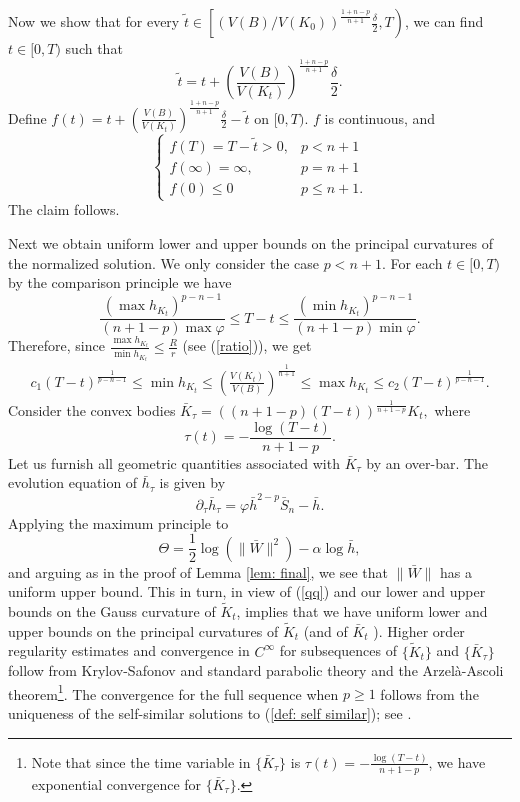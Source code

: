 \documentclass{amsart}
\theoremstyle{definition}
\theoremstyle{remark}
\numberwithin{equation}{section}
\begin{document}
Now we show that for every
 $\tilde{t}\in\left[\left(V(B)/V(K_0)\right)^{\frac{1+n-p}{n+1}}\frac{\delta}{2},T\right)$, we can find $t\in[0,T)$ such that
\[\tilde{t}=t+\left(\frac{V(B)}{V(K_t)}\right)^{\frac{1+n-p}{n+1}}\frac{\delta}{2}.\]
Define $f(t)=t+\left(\frac{V(B)}{V(K_t)}\right)^{\frac{1+n-p}{n+1}}\frac{\delta}{2}-\tilde{t}$ on $[0,T)$.
$f$ is continuous, and
\[\left\{
    \begin{array}{ll}
      f(T)=T-\tilde{t}>0, & p<n+1 \\
      f(\infty)=\infty, & p= n+1 \\
      f(0)\leq 0& p\leq  n+1 .
    \end{array}
  \right.
\]
The claim follows.

Next we obtain uniform lower and upper bounds on the principal curvatures of the normalized solution. We only consider the case $p<n+1.$
For each $t\in [0,T)$ by the comparison principle we have
\[\frac{(\max h_{K_t})^{p-n-1}}{(n+1-p)\max \varphi}\leq T-t\leq \frac{(\min h_{K_t})^{{p-n-1}}}{(n+1-p)\min \varphi}.\]
Therefore, since $\frac{\max h_{K_t}}{\min h_{K_t}}\leq \frac{R}{r}$ (see (\ref{ratio})), we get
\begin{align}\label{qq}
c_1(T-t)^{\frac{1}{p-n-1}}\leq \min h_{K_t} \leq \left(\frac{V(K_t)}{V(B)}\right)^{\frac{1}{n+1}}\leq \max h_{K_t}\leq c_2(T-t)^{\frac{1}{p-n-1}}.
\end{align}
Consider the convex bodies $\bar{K}_{\tau}=((n+1-p)(T-t))^{\frac{1}{n+1-p}}K_t,$ where
$$\tau(t)=-\frac{\log(T-t)}{n+1-p}.$$
Let us furnish all geometric quantities associated with $\bar{K}_{\tau}$ by an over-bar.
The evolution equation of $\bar{h}_{\tau}$ is given by
\[\partial_\tau \bar{h}_{\tau}=\varphi \bar{h}^{2-p}\bar{S}_n-\bar{h}.\]
Applying the maximum principle to
\[\Theta=\frac 12\log(\|\bar{W}\|^2)-\alpha\log \bar{h},\]
and arguing as in the proof of Lemma \ref{lem: final}, we see that $\|\bar{W}\|$ has a uniform upper bound. This in turn, in view of (\ref{qq}) and our lower and upper bounds on the Gauss curvature of $\tilde{K}_t$, implies that we have uniform lower and upper bounds on the principal curvatures of $\tilde{K}_t$ (and of $\bar{K}_t$ ). Higher order regularity estimates and convergence in $C^{\infty}$ for subsequences of $\{\tilde{K}_{t}\}$ and $\{\bar{K}_{\tau}\}$ follow from Krylov-Safonov and standard parabolic theory and the Arzel\`{a}-Ascoli theorem\footnote{Note that since the time variable in $\{\bar{K}_{\tau}\}$ is
$\tau(t)=-\frac{\log(T-t)}{n+1-p}$, we have exponential convergence for $\{\bar{K}_{\tau}\}$.}. The convergence for the full sequence when $p\geq 1$ follows from the uniqueness of the self-similar solutions to (\ref{def: self similar}); see \cite{Lu1,39}.
\end{document}
